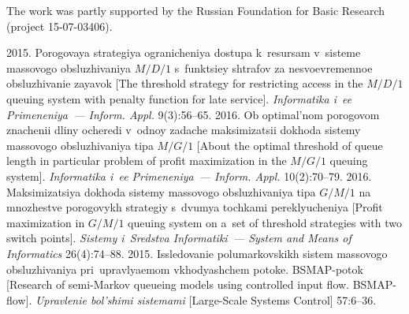   


\Ack
\noindent
The work was partly supported by the Russian Foundation
for Basic Research
(project 15-07-03406). 




  \begin{multicols}{2}

\renewcommand{\bibname}{\protect\rmfamily References}

{\small\frenchspacing
 {%
 \begin{thebibliography}{9}
 2015. Porogovaya strategiya ogranicheniya dostupa 
k~resursam v~sisteme massovogo ob\-slu\-zhi\-va\-niya 
$M/D/1$ s~funktsiey shtrafov za nesvoevremennoe 
obsluzhivanie zayavok [The threshold strategy for restricting access in the $M/D/1$ 
queuing system with penalty function for late service]. \textit{Informatika i~ee 
Primeneniya~--- Inform. Appl.} 9(3):56--65.
 2016. Ob 
optimal'nom porogovom znachenii  dliny ocheredi v~odnoy zadache maksimizatsii 
dokhoda sistemy massovogo ob\-slu\-zhi\-va\-niya tipa $M/G/1$ [About the optimal threshold of queue length in 
particular problem of profit maximization in the $M/G/1$ queuing system]. 
\textit{Informatika i~ee Primeneniya~--- Inform. Appl.} 10(2):70--79.
 2016. 
Maksimizatsiya dokhoda sistemy massovogo ob\-slu\-zhi\-va\-niya 
tipa $G/M/1$  na mnozhestve porogovykh strategiy 
s~dvumya tochkami pereklyucheniya [Profit maximization in $G/M/1$ queuing 
system on a~set of threshold strategies with two switch points]. \textit{Sistemy  i~Sredstva 
Informatiki~--- System and Means of Informatics} 26(4):74--88.
 2015. Issledovanie 
polumarkovskikh sistem massovogo obsluzhivaniya pri\ uprav\-lyaemom 
vkhodyashchem potoke.  BSMAP-potok [Research of semi-Markov queueing models 
using controlled input flow. BSMAP-flow]. \textit{Upravlenie bol'shimi sistemami}  
[Large-Scale Systems Control] 57:6--36.

\end{thebibliography}}}
\end{multicols}
